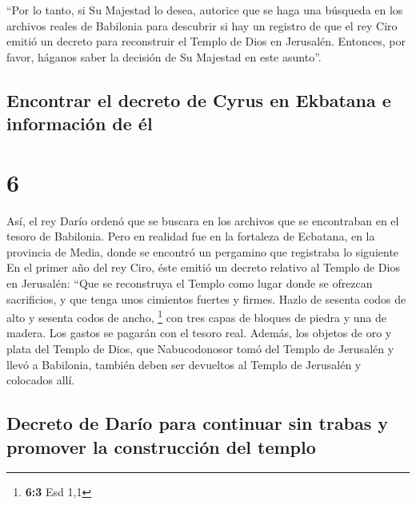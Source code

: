  ``Por lo tanto, si Su Majestad lo desea, autorice que se
haga una búsqueda en los archivos reales de Babilonia para descubrir si
hay un registro de que el rey Ciro emitió un decreto para reconstruir el
Templo de Dios en Jerusalén. Entonces, por favor, háganos saber la
decisión de Su Majestad en este asunto''.

\hypertarget{encontrar-el-decreto-de-cyrus-en-ekbatana-e-informaciuxf3n-de-uxe9l}{%
\subsection{Encontrar el decreto de Cyrus en Ekbatana e información de
él}\label{encontrar-el-decreto-de-cyrus-en-ekbatana-e-informaciuxf3n-de-uxe9l}}

\hypertarget{section-5}{%
\section{6}\label{section-5}}

 Así, el rey Darío ordenó que se buscara en los archivos
que se encontraban en el tesoro de Babilonia.  Pero en
realidad fue en la fortaleza de Ecbatana, en la provincia de Media,
donde se encontró un pergamino que registraba lo siguiente
 En el primer año del rey Ciro, éste emitió un decreto
relativo al Templo de Dios en Jerusalén: ``Que se reconstruya el Templo
como lugar donde se ofrezcan sacrificios, y que tenga unos cimientos
fuertes y firmes. Hazlo de sesenta codos de alto y sesenta codos de
ancho, \footnote{\textbf{6:3} Esd 1,1}  con tres capas de
bloques de piedra y una de madera. Los gastos se pagarán con el tesoro
real.  Además, los objetos de oro y plata del Templo de
Dios, que Nabucodonosor tomó del Templo de Jerusalén y llevó a
Babilonia, también deben ser devueltos al Templo de Jerusalén y
colocados allí.

\hypertarget{decreto-de-daruxedo-para-continuar-sin-trabas-y-promover-la-construcciuxf3n-del-templo}{%
\subsection{Decreto de Darío para continuar sin trabas y promover la
construcción del
templo}\label{decreto-de-daruxedo-para-continuar-sin-trabas-y-promover-la-construcciuxf3n-del-templo}}


